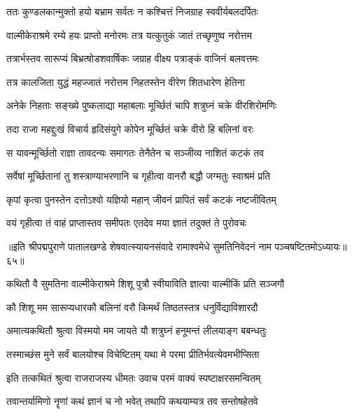 \twolineshloka
{ततः कुण्डलकान्मुक्तो हयो बभ्राम सर्वतः}
{न कश्चित्तं निजग्राह स्ववीर्यबलदर्पितः}%

\twolineshloka
{वाल्मीकेराश्रमे रम्ये हयः प्राप्तो मनोरमः}
{तत्र यत्कुतुकं जातं तच्छृणुष्व नरोत्तम}%

\twolineshloka
{तत्रार्भस्तव सारूप्यं बिभ्रत्षोडशवार्षिकः}
{जग्राह वीक्ष्य पत्राङ्कं वाजिनं बलवत्तमः}%

\twolineshloka
{तत्र कालजिता युद्धं महज्जातं नरोत्तम}
{निहतस्तेन वीरेण शितधारेण हेतिना}%

\twolineshloka
{अनेके निहताः सङ्ख्ये पुष्कलाद्या महाबलाः}
{मूर्च्छितं चापि शत्रुघ्नं चक्रे वीरशिरोमणिः}%

\twolineshloka
{तदा राजा महद्दुःखं विचार्य हृदिसंयुगे}
{कोपेन मूर्च्छितं चक्रे वीरो हि बलिनां वरः}%

\twolineshloka
{स यावन्मूर्च्छितो राज्ञा तावदन्यः समागतः}
{तेनैतेन च सञ्जीव्य नाशितं कटकं तव}%

\twolineshloka
{सर्वेषां मूर्च्छितानां तु शस्त्राण्याभरणानि च}
{गृहीत्वा वानरौ बद्धौ जग्मतुः स्वाश्रमं प्रति}%

\twolineshloka
{कृपां कृत्वा पुनस्तेन दत्तोऽश्वो यज्ञियो महान्}
{जीवनं प्रापितं सर्वं कटकं नष्टजीवितम्}%

\twolineshloka
{वयं गृहीत्वा तं वाहं प्राप्तास्तव समीपतः}
{एतदेव मया ज्ञातं तदुक्तं ते पुरोवचः}%

{॥इति श्रीपद्मपुराणे पातालखण्डे शेषवात्स्यायनसंवादे रामाश्वमेधे सुमतिनिवेदनं नाम पञ्चषष्टितमोऽध्यायः॥६५॥}



\twolineshloka
{कथितौ वै सुमतिना वाल्मीकेराश्रमे शिशू}
{पुत्रौ स्वीयाविति ज्ञात्वा वाल्मीकिं प्रति सञ्जगौ}%


\twolineshloka
{कौ शिशू मम सारूप्यधारकौ बलिनां वरौ}
{किमर्थं तिष्ठतस्तत्र धनुर्विद्याविशारदौ}%

\twolineshloka
{अमात्यकथितौ श्रुत्वा विस्मयो मम जायते}
{यौ शत्रुघ्नं हनूमन्तं लीलयाङ्ग बबन्धतुः}%

\twolineshloka
{तस्माच्छंस मुने सर्वं बालयोश्च विचेष्टितम्}
{यथा मे परमा प्रीतिर्भवत्येवमभीप्सिता}%

\twolineshloka
{इति तत्कथितं श्रुत्वा राजराजस्य धीमतः}
{उवाच परमं वाक्यं स्पष्टाक्षरसमन्वितम्}%


\twolineshloka
{तवान्तर्यामिणो नॄणां कथं ज्ञानं च नो भवेत्}
{तथापि कथयाम्यत्र तव सन्तोषहेतवे}%

